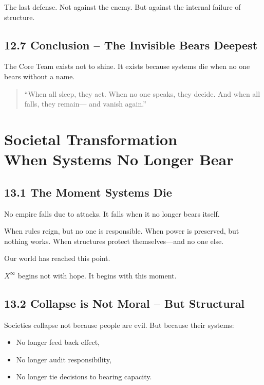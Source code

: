 \documentclass[12pt,a4paper]{book}
\begin{document}
The last defense.  
Not against the enemy.  
But against the internal failure of structure.

\section*{12.7 Conclusion – The Invisible Bears Deepest}

The Core Team exists not to shine.  
It exists because systems die when no one bears without a name.

\begin{quote}
“When all sleep, they act.  
When no one speaks, they decide.  
And when all falls, they remain—  
and vanish again.”  
\end{quote}

\chapter{Societal Transformation\\When Systems No Longer Bear}

\section*{13.1 The Moment Systems Die}

No empire falls due to attacks.  
It falls when it no longer bears itself.

When rules reign, but no one is responsible.  
When power is preserved, but nothing works.  
When structures protect themselves—and no one else.

Our world has reached this point.

$X^\infty$ begins not with hope.  
It begins with this moment.

\section*{13.2 Collapse is Not Moral – But Structural}

Societies collapse not because people are evil.  
But because their systems:

\begin{itemize}
    \item No longer feed back effect,
    \item No longer audit responsibility,
    \item No longer tie decisions to bearing capacity.
\end{itemize}
\end{document}
